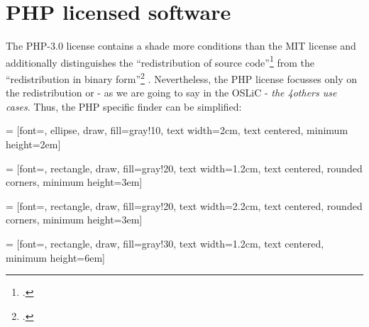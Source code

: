 %
%
%
%
%



\section{PHP licensed software}

The PHP-3.0 license contains a shade more conditions than the MIT license and
additionally distinguishes the \enquote{redistribution of source
code}\footcite[cf.][wp. §1]{Php30OsiLicense2013a} from the
\enquote{redistribution in binary form}\footcite[cf.][wp.
§2]{Php30OsiLicense2013a} . Nevertheless, the PHP license focusses only on the
redistribution or - as we are going to say in the OSLiC - \emph{the 4others use
cases}. Thus, the PHP specific finder can be simplified:

 = [font=\small, ellipse, draw, fill=gray!10, 
    text width=2cm, text centered, minimum height=2em]


 = [font=\footnotesize, rectangle, draw, fill=gray!20, 
    text width=1.2cm, text centered, rounded corners, minimum height=3em]

 = [font=\footnotesize, rectangle, draw, fill=gray!20, 
    text width=2.2cm, text centered, rounded corners, minimum height=3em]
    
 = [font=\tiny, rectangle, draw, fill=gray!30, 
    text width=1.2cm, text centered, minimum height=6em]

